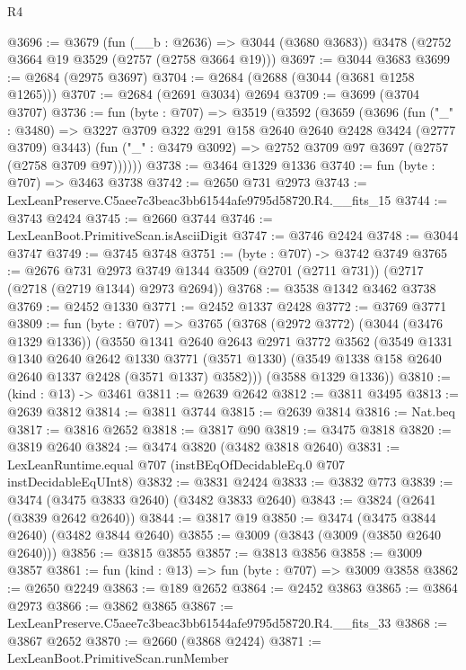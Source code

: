 \begin{lexlean}{R4}
\begin{coremodule}
@3696 := @3679
    (fun (__b : @2636) => @3044 (@3680 @3683))
    @3478
    (@2752 @3664 @19 @3529 (@2757 (@2758 @3664 @19)))
@3697 := @3044 @3683
@3699 := @2684 (@2975 @3697)
@3704 := @2684 (@2688 (@3044 (@3681 @1258 @1265)))
@3707 := @2684 (@2691 @3034) @2694
@3709 := @3699 (@3704 @3707)
@3736 := fun (byte : @707) =>
  @3519
    (@3592
      (@3659
        (@3696
          (fun ("_" : @3480) =>
          @3227 @3709 @322 @291 @158 @2640 @2640 @2428 @3424 (@2777 @3709) @3443)
          (fun ("_" : @3479 @3092) => @2752 @3709 @97 @3697 (@2757 (@2758 @3709 @97))))))
@3738 := @3464 @1329 @1336
@3740 := fun (byte : @707) => @3463 @3738
@3742 := @2650 @731 @2973
@3743 := LexLeanPreserve.C5aee7c3beac3bb61544afe9795d58720.R4.__fits_15
@3744 := @3743 @2424
@3745 := @2660 @3744
@3746 := LexLeanBoot.PrimitiveScan.isAsciiDigit
@3747 := @3746 @2424
@3748 := @3044 @3747
@3749 := @3745 @3748
@3751 := (byte : @707) -> @3742 @3749
@3765 := @2676
    @731
    @2973
    @3749
    @1344
    @3509
    (@2701 (@2711 @731))
    (@2717 (@2718 (@2719 @1344) @2973 @2694))
@3768 := @3538 @1342 @3462 @3738
@3769 := @2452 @1330
@3771 := @2452 @1337 @2428
@3772 := @3769 @3771
@3809 := fun (byte : @707) =>
  @3765
    (@3768
      (@2972 @3772)
      (@3044 (@3476 @1329 @1336))
      (@3550
        @1341
        @2640
        @2643
        @2971
        @3772
        @3562
        (@3549
          @1331
          @1340
          @2640
          @2642
          @1330
          @3771
          (@3571 @1330)
          (@3549 @1338 @158 @2640 @2640 @1337 @2428 (@3571 @1337) @3582)))
      (@3588 @1329 @1336))
@3810 := (kind : @13) -> @3461
@3811 := @2639 @2642
@3812 := @3811 @3495
@3813 := @2639 @3812
@3814 := @3811 @3744
@3815 := @2639 @3814
@3816 := Nat.beq
@3817 := @3816 @2652
@3818 := @3817 @90
@3819 := @3475 @3818
@3820 := @3819 @2640
@3824 := @3474 @3820 (@3482 @3818 @2640)
@3831 := LexLeanRuntime.equal @707 (instBEqOfDecidableEq.{0} @707 instDecidableEqUInt8)
@3832 := @3831 @2424
@3833 := @3832 @773
@3839 := @3474 (@3475 @3833 @2640) (@3482 @3833 @2640)
@3843 := @3824 (@2641 (@3839 @2642 @2640))
@3844 := @3817 @19
@3850 := @3474 (@3475 @3844 @2640) (@3482 @3844 @2640)
@3855 := @3009 (@3843 (@3009 (@3850 @2640 @2640)))
@3856 := @3815 @3855
@3857 := @3813 @3856
@3858 := @3009 @3857
@3861 := fun (kind : @13) => fun (byte : @707) => @3009 @3858
@3862 := @2650 @2249
@3863 := @189 @2652
@3864 := @2452 @3863
@3865 := @3864 @2973
@3866 := @3862 @3865
@3867 := LexLeanPreserve.C5aee7c3beac3bb61544afe9795d58720.R4.__fits_33
@3868 := @3867 @2652
@3870 := @2660 (@3868 @2424)
@3871 := LexLeanBoot.PrimitiveScan.runMember

\end{coremodule}
\end{lexlean}
